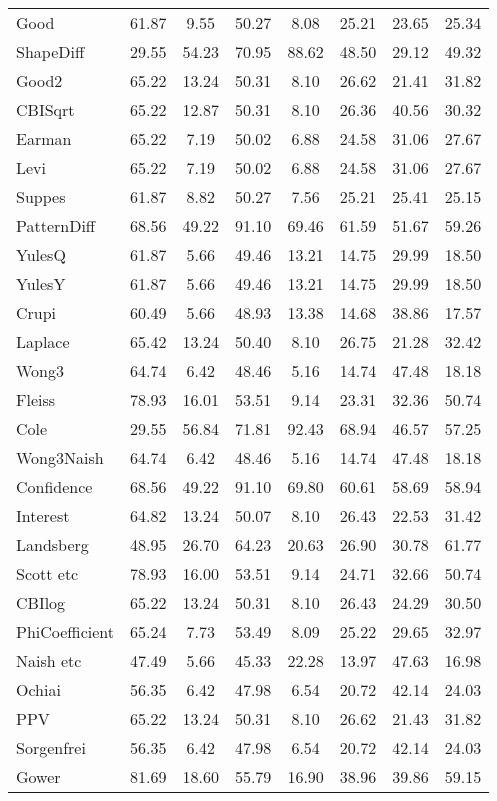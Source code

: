 \begin{tabular}{l||c|c|c|c|c|c|c}
Good& 61.87& 9.55& 50.27& 8.08& 25.21& 23.65& 25.34\\
ShapeDiff& 29.55& 54.23& 70.95& 88.62& 48.50& 29.12& 49.32\\
Good2& 65.22& 13.24& 50.31& 8.10& 26.62& 21.41& 31.82\\
CBISqrt& 65.22& 12.87& 50.31& 8.10& 26.36& 40.56& 30.32\\
Earman& 65.22& 7.19& 50.02& 6.88& 24.58& 31.06& 27.67\\
Levi& 65.22& 7.19& 50.02& 6.88& 24.58& 31.06& 27.67\\
Suppes& 61.87& 8.82& 50.27& 7.56& 25.21& 25.41& 25.15\\
PatternDiff& 68.56& 49.22& 91.10& 69.46& 61.59& 51.67& 59.26\\
YulesQ& 61.87& 5.66& 49.46& 13.21& 14.75& 29.99& 18.50\\
YulesY& 61.87& 5.66& 49.46& 13.21& 14.75& 29.99& 18.50\\
Crupi& 60.49& 5.66& 48.93& 13.38& 14.68& 38.86& 17.57\\
Laplace& 65.42& 13.24& 50.40& 8.10& 26.75& 21.28& 32.42\\
Wong3& 64.74& 6.42& 48.46& 5.16& 14.74& 47.48& 18.18\\
Fleiss& 78.93& 16.01& 53.51& 9.14& 23.31& 32.36& 50.74\\
Cole& 29.55& 56.84& 71.81& 92.43& 68.94& 46.57& 57.25\\
Wong3Naish& 64.74& 6.42& 48.46& 5.16& 14.74& 47.48& 18.18\\
Confidence& 68.56& 49.22& 91.10& 69.80& 60.61& 58.69& 58.94\\
Interest& 64.82& 13.24& 50.07& 8.10& 26.43& 22.53& 31.42\\
Landsberg& 48.95& 26.70& 64.23& 20.63& 26.90& 30.78& 61.77\\
Scott etc& 78.93& 16.00& 53.51& 9.14& 24.71& 32.66& 50.74\\
CBIlog& 65.22& 13.24& 50.31& 8.10& 26.43& 24.29& 30.50\\
PhiCoefficient& 65.24& 7.73& 53.49& 8.09& 25.22& 29.65& 32.97\\
Naish etc& 47.49& 5.66& 45.33& 22.28& 13.97& 47.63& 16.98\\
Ochiai& 56.35& 6.42& 47.98& 6.54& 20.72& 42.14& 24.03\\
PPV& 65.22& 13.24& 50.31& 8.10& 26.62& 21.43& 31.82\\
Sorgenfrei& 56.35& 6.42& 47.98& 6.54& 20.72& 42.14& 24.03\\
Gower& 81.69& 18.60& 55.79& 16.90& 38.96& 39.86& 59.15\\

\end{tabular}
